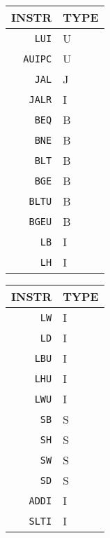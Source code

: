\begin{table}[!htb]
    \centering
    \begin{minipage}{.25\linewidth}
        \centering
        \begin{tabular}{r|l}
            \hline
            INSTR          & TYPE \\
            \hline
            \texttt{LUI}   & U    \\
            \texttt{AUIPC} & U    \\
            \hline
            \texttt{JAL}   & J    \\
            \texttt{JALR}  & I    \\
            \hline
            \texttt{BEQ}   & B    \\
            \texttt{BNE}   & B    \\
            \texttt{BLT}   & B    \\
            \texttt{BGE}   & B    \\
            \texttt{BLTU}  & B    \\
            \texttt{BGEU}  & B    \\
            \hline
            \texttt{LB}    & I    \\
            \texttt{LH}    & I    \\
        \end{tabular}
    \end{minipage}%
    \begin{minipage}{.25\linewidth}
        \centering
        \begin{tabular}{r|l}
            \hline
            INSTR          & TYPE \\
            \hline
            \texttt{LW}    & I    \\
            \texttt{LD}    & I    \\
            \texttt{LBU}   & I    \\
            \texttt{LHU}   & I    \\
            \texttt{LWU}   & I    \\
            \hline
            \texttt{SB}    & S    \\
            \texttt{SH}    & S    \\
            \texttt{SW}    & S    \\
            \texttt{SD}    & S    \\
            \hline
            \texttt{ADDI}  & I    \\
            \texttt{SLTI}  & I    \\

\end{tabular}
\end{minipage}
\end{table}
